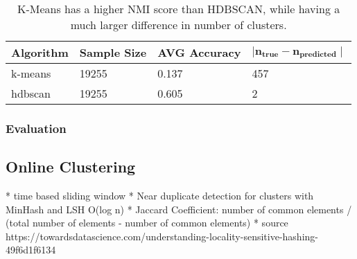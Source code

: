 \begin{table}[h]
    \centering
    \begin{tabular}{|l|l|l|l|}
    \hline
    \textbf{Algorithm} & \textbf{Sample Size} & \textbf{AVG Accuracy}  & $\mathbf{ \mid n_{true} - n_{predicted} \mid }$ \\ \hline
    k-means & 19255 & 0.137 & 457 \\ \hline
    hdbscan & 19255 & 0.605 & 2 \\ \hline
    \end{tabular}
    \caption{K-Means has a higher NMI score than HDBSCAN, while having a much larger difference in number of clusters.}
    \label{tab:avg_predict_kmeans_example}
\end{table}

    
\subsubsection{Evaluation}


\subsection{Online Clustering}

* time based sliding window
* Near duplicate detection for clusters with MinHash and LSH O(log n)
* Jaccard Coefficient: number of common elements / (total number of elements - number of common elements)
* source https://towardsdatascience.com/understanding-locality-sensitive-hashing-49f6d1f6134

